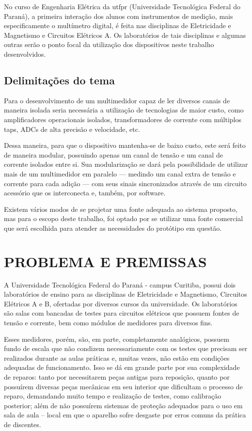 No curso de Engenharia Elétrica da \gls{utfpr} (Universidade Tecnológica Federal do Paraná), a primeira interação dos alunos com instrumentos de medição, mais especificamente o multímetro digital, é feita nas disciplinas de Eletricidade e Magnetismo e Circuitos Elétricos A. Os laboratórios de tais disciplinas e algumas outras serão o ponto focal da utilização dos dispositivos neste trabalho desenvolvidos.

\subsection{Delimitações do tema}\label{subsec:del-tema}
Para o desenvolvimento de um multimedidor capaz de ler diversos canais de maneira isolada seria necessária a utilização de tecnologias de maior custo, como amplificadores operacionais isolados, transformadores de corrente com múltiplos taps, \gls{ADC}s de alta precisão e velocidade, etc.

Dessa maneira, para que o dispositivo mantenha-se de baixo custo, este será feito de maneira modular, possuindo apenas um canal de tensão e um canal de corrente isolados entre si. Sua modularização se dará pela possibilidade de utilizar mais de um multimedidor em paralelo --- medindo um canal extra de tensão e corrente para cada adição --- com seus sinais sincronizados através de um circuito acessório que os interconecta e, também, por software.

Existem vários modos de se projetar uma fonte adequada ao sistema proposto, mas para o escopo deste trabalho, foi optado por se utilizar uma fonte comercial que será escolhida para atender as necessidades do protótipo em questão.

\section{PROBLEMA E PREMISSAS}\label{sec:probpremiss}
A Universidade Tecnológica Federal do Paraná - campus Curitiba, possui dois laboratórios de ensino para as disciplinas de Eletricidade e Magnetismo, Circuitos Elétricos A e B, ofertadas por diversos cursos da universidade. Os laboratórios são salas com bancadas de testes para circuitos elétricos que possuem fontes de tensão e corrente, bem como módulos de medidores para diversos fins.

Esses medidores, porém, são, em parte, completamente analógicos, possuem fundo de escala que não condizem necessariamente com os testes que precisam ser realizados durante as aulas práticas e, muitas vezes, não estão em condições adequadas de funcionamento. Isso se dá em grande parte por sua complexidade de reparos: tanto por necessitarem peças antigas para reposição, quanto por possuírem diversas peças mecânicas em seu interior que dificultam o processo de reparo, demandando muito tempo e realização de testes, como calibração posterior; além de não possuírem sistemas de proteção adequados para o uso em sala de aula – local em que o aparelho sofre desgaste por erros comuns da prática de discentes.

